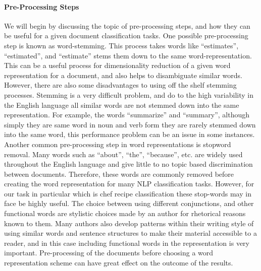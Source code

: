 \documentclass[paper=a4, fontsize=11pt]{scrartcl} %
\begin{document}
\paragraph{Pre-Processing Steps}
We will begin by discussing the topic of pre-processing steps, and how they can be useful for a given document classification tasks.  
One possible pre-processing step is known as word-stemming.  
This process takes words like ``estimates'', ``estimated'', and ``estimate'' stems them down to the same word-representation.  
This can be a useful process for dimensionality reduction of a given word representation for a document, and also helps to disambiguate similar words.  
However, there are also some disadvantages to using off the shelf stemming processes.  Stemming is a very difficult problem, and do to the high variability in the English language all similar words are not stemmed down into the same representation.  
For example, the words ``summarize'' and ``summary'', although simply they are same word in noun and verb form they are rarely stemmed down into the same word, this performance problem can be an issue in some instances.  
Another common pre-processing step in word representations is stopword removal.  Many words such as ``about'', ``the'', ``because'', etc. are widely used throughout the English language and give little to no topic based discrimination between documents.  
Therefore, these words are commonly removed before creating the word representation for many NLP classification tasks.  However, for our task in particular which is chef recipe classification these stop-words may in face be highly useful.  
The choice between using different conjunctions, and other functional words are stylistic choices made by an author for rhetorical reasons known to them.  
Many authors also develop patterns within their writing style of using similar words and sentence structures to make their material accessible to a reader, and in this case including functional words in the representation is very important.  
Pre-processing of the documents before choosing a word representation scheme can have great effect on the outcome of the results.
\end{document}
